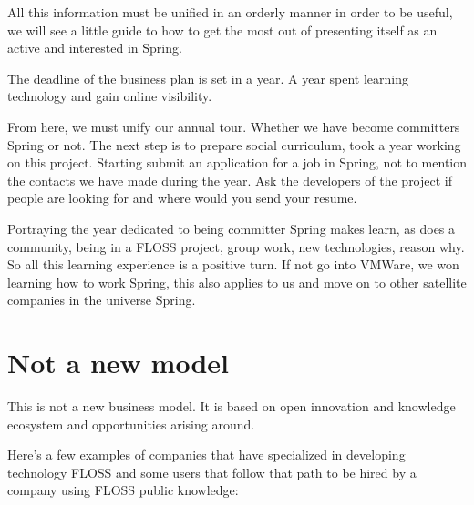 \documentclass[11pt]{scrartcl}
\begin{document}
\par All this information must be unified in an orderly manner in order to be useful, we will see a little guide to how to get the most out of presenting itself as an active and interested in Spring.

\par The deadline of the business plan is set in a year. A year spent learning technology and gain online visibility.

\par From here, we must unify our annual tour. Whether we have become committers Spring or not. The next step is to prepare social curriculum, took a year working on this project. Starting submit an application for a job in Spring, not to mention the contacts we have made during the year. Ask the developers of the project if people are looking for and where would you send your resume.

\par Portraying the year dedicated to being committer Spring makes learn, as does a community, being in a FLOSS project, group work, new technologies, reason why. So all this learning experience is a positive turn. If not go into VMWare, we won learning how to work Spring, this also applies to us and move on to other satellite companies in the universe Spring.

\section{Not a new model}

\par This is not a new business model. It is based on open innovation and knowledge ecosystem and opportunities arising around.

\par Here's a few examples of companies that have specialized in developing technology FLOSS and some users that follow that path to be hired by a company using FLOSS public knowledge:
\end{document}
